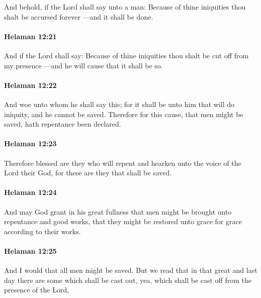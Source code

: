 			And behold, if the Lord shall say unto a man:
			Because of thine iniquities thou shalt be accursed forever
			---and it shall be done.

		\paragraph{Helaman 12:21} %
			\label{HELAMAN-12-21}

			And if the Lord shall say:
			Because of thine iniquities thou shalt be cut off from my presence
			---and he will cause that it shall be so.

		\paragraph{Helaman 12:22} %
			\label{HELAMAN-12-22}

			And woe unto whom he shall say this;
			for it shall be unto him that will do iniquity,
			and he cannot be saved.
			Therefore for this cause, that men might be saved,
			hath repentance been declared.

		\paragraph{Helaman 12:23} %
			\label{HELAMAN-12-23}

			Therefore blessed are they who will repent
			and hearken unto the voice of the Lord their God,
			for these are they that shall be saved.

		\paragraph{Helaman 12:24} %
			\label{HELAMAN-12-24}

			And may God grant in his great fullness
			that men might be brought unto repentance and good works,
			that they might be restored unto grace for grace according to their works.

		\paragraph{Helaman 12:25} %
			\label{HELAMAN-12-25}

			And I would that all men might be saved.
			But we read that in that great and last day
			there are some which shall be cast out,
			yea, which shall be cast off from the presence of the Lord,

